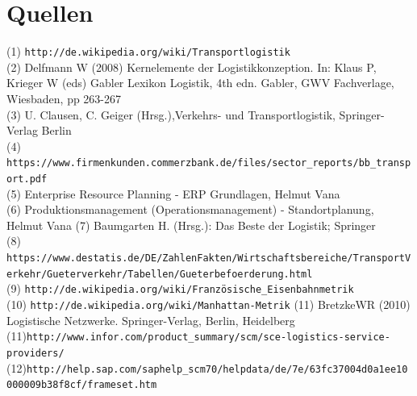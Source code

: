 \documentclass[a4paper,12pt]{scrreprt}
\begin{document}
		
\chapter{Quellen} 
(1) \nolinkurl{http://de.wikipedia.org/wiki/Transportlogistik}\\
(2) Delfmann W (2008) Kernelemente der Logistikkonzeption. In: Klaus P, Krieger W (eds) Gabler
Lexikon Logistik, 4th edn. Gabler, GWV Fachverlage, Wiesbaden, pp 263-267\\
(3) U. Clausen, C. Geiger (Hrsg.),Verkehrs- und Transportlogistik, Springer-Verlag Berlin\\
(4) \nolinkurl{https://www.firmenkunden.commerzbank.de/files/sector_reports/bb_transport.pdf}\\
(5) Enterprise Resource Planning - ERP Grundlagen, Helmut Vana\\
(6) Produktionsmanagement (Operationsmanagement) - Standortplanung, Helmut Vana
(7) Baumgarten H. (Hrsg.): Das Beste der Logistik; Springer\\
(8) \nolinkurl{https://www.destatis.de/DE/ZahlenFakten/Wirtschaftsbereiche/TransportVerkehr/Gueterverkehr/Tabellen/Gueterbefoerderung.html}\\
(9) \nolinkurl{http://de.wikipedia.org/wiki/Französische_Eisenbahnmetrik}\\
(10) \nolinkurl{http://de.wikipedia.org/wiki/Manhattan-Metrik}
(11) BretzkeWR (2010) Logistische Netzwerke. Springer-Verlag, Berlin, Heidelberg
(11)\nolinkurl{http://www.infor.com/product_summary/scm/sce-logistics-service-providers/}
(12)\nolinkurl{http://help.sap.com/saphelp_scm70/helpdata/de/7e/63fc37004d0a1ee10000009b38f8cf/frameset.htm}
\end{document}
